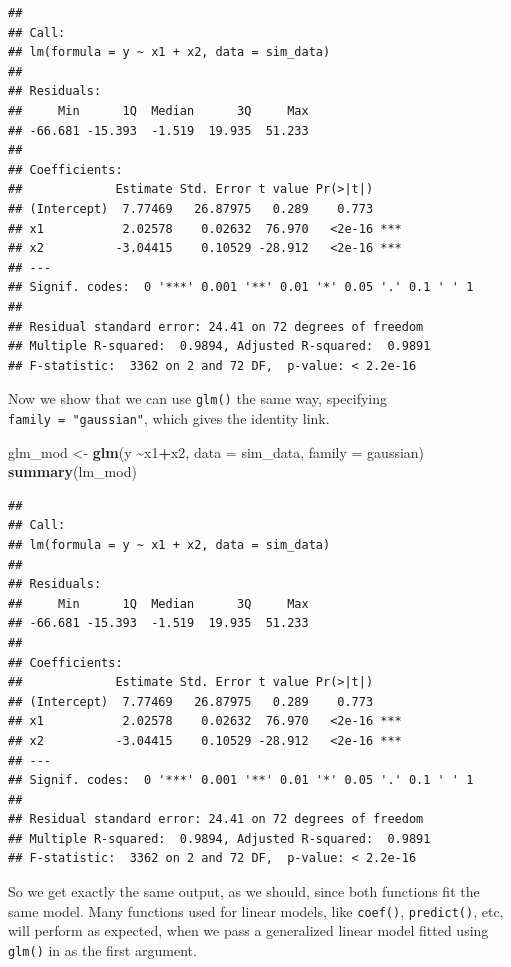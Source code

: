 \documentclass[
]{book}
\newenvironment{Shaded}{\begin{snugshade}}{\end{snugshade}}
\newcommand{\DataTypeTok}[1]{\textcolor[rgb]{0.13,0.29,0.53}{#1}}
\newcommand{\KeywordTok}[1]{\textcolor[rgb]{0.13,0.29,0.53}{\textbf{#1}}}
\newcommand{\NormalTok}[1]{#1}
\newcommand{\OperatorTok}[1]{\textcolor[rgb]{0.81,0.36,0.00}{\textbf{#1}}}
\newcommand{\StringTok}[1]{\textcolor[rgb]{0.31,0.60,0.02}{#1}}
\begin{document}
\begin{verbatim}
## 
## Call:
## lm(formula = y ~ x1 + x2, data = sim_data)
## 
## Residuals:
##     Min      1Q  Median      3Q     Max 
## -66.681 -15.393  -1.519  19.935  51.233 
## 
## Coefficients:
##             Estimate Std. Error t value Pr(>|t|)    
## (Intercept)  7.77469   26.87975   0.289    0.773    
## x1           2.02578    0.02632  76.970   <2e-16 ***
## x2          -3.04415    0.10529 -28.912   <2e-16 ***
## ---
## Signif. codes:  0 '***' 0.001 '**' 0.01 '*' 0.05 '.' 0.1 ' ' 1
## 
## Residual standard error: 24.41 on 72 degrees of freedom
## Multiple R-squared:  0.9894, Adjusted R-squared:  0.9891 
## F-statistic:  3362 on 2 and 72 DF,  p-value: < 2.2e-16
\end{verbatim}

Now we show that we can use \texttt{glm()} the same way, specifying \texttt{family\ =\ "gaussian"}, which gives the identity link.

\begin{Shaded}
\begin{Highlighting}[]
\NormalTok{glm\_mod \textless{}{-}}\StringTok{ }\KeywordTok{glm}\NormalTok{(y }\OperatorTok{\textasciitilde{}}\NormalTok{x1}\OperatorTok{+}\NormalTok{x2, }\DataTypeTok{data =}\NormalTok{ sim\_data, }\DataTypeTok{family =}\NormalTok{ gaussian)}
\KeywordTok{summary}\NormalTok{(lm\_mod)}
\end{Highlighting}
\end{Shaded}

\begin{verbatim}
## 
## Call:
## lm(formula = y ~ x1 + x2, data = sim_data)
## 
## Residuals:
##     Min      1Q  Median      3Q     Max 
## -66.681 -15.393  -1.519  19.935  51.233 
## 
## Coefficients:
##             Estimate Std. Error t value Pr(>|t|)    
## (Intercept)  7.77469   26.87975   0.289    0.773    
## x1           2.02578    0.02632  76.970   <2e-16 ***
## x2          -3.04415    0.10529 -28.912   <2e-16 ***
## ---
## Signif. codes:  0 '***' 0.001 '**' 0.01 '*' 0.05 '.' 0.1 ' ' 1
## 
## Residual standard error: 24.41 on 72 degrees of freedom
## Multiple R-squared:  0.9894, Adjusted R-squared:  0.9891 
## F-statistic:  3362 on 2 and 72 DF,  p-value: < 2.2e-16
\end{verbatim}

So we get exactly the same output, as we should, since both functions fit the same model. Many functions used for linear models, like \texttt{coef()}, \texttt{predict()}, etc, will perform as expected, when we pass a generalized linear model fitted using \texttt{glm()} in as the first argument.
\end{document}
